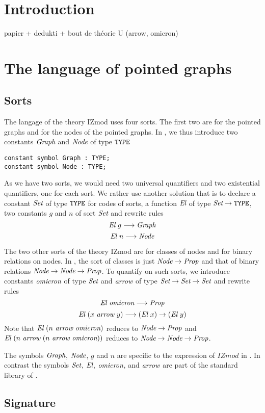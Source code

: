 \documentclass[a4paper]{article}
\begin{document}
\thispagestyle{empty}
\section{Introduction}

papier + dedukti + bout de théorie U (arrow, omicron)

\section{The language of pointed graphs}

\subsection{Sorts}

The langage of the theory IZmod uses four sorts. The first two are for
the pointed graphs and for the nodes of the pointed graphs.  In
\dedukti, we thus introduce two constants ${\mbox{\it Graph}}$ and ${\mbox{\it Node}}$ of type
$\mbox{\tt TYPE}$
\begin{verbatim}
constant symbol Graph : TYPE;
constant symbol Node : TYPE;
\end{verbatim}
As we have two sorts, we would need two universal quantifiers and two
existential quantifiers, one for each sort.  We rather use another
solution \cite{theoryU} that is to declare a constant $\mbox{\it Set}$ of type
$\mbox{\tt TYPE}$ for codes of sorts, a function ${\mbox{\it El}}$ of type $\mbox{\it Set} \rightarrow \mbox{\tt TYPE}$,
two constants $g$ and $n$ of sort $\mbox{\it Set}$ and rewrite rules
$${\mbox{\it El}}~g \longrightarrow {\mbox{\it Graph}}$$
$${\mbox{\it El}}~n \longrightarrow {\mbox{\it Node}}$$

The two other sorts of the theory IZmod are for classes of nodes and
for binary relations on nodes.  In \dedukti, the sort of classes is
just ${\mbox{\it Node}} \rightarrow {\mbox{\it Prop}}$ and that of binary relations
${\mbox{\it Node}} \rightarrow {\mbox{\it Node}} \rightarrow {\mbox{\it Prop}}$. To quantify on such sorts, we introduce
constants ${\mbox{\it omicron}}$ of type $\mbox{\it Set}$ and ${\mbox{\it arrow}} $ of type
$\mbox{\it Set} \rightarrow \mbox{\it Set} \rightarrow \mbox{\it Set}$ and rewrite rules
$${\mbox{\it El}}~{\mbox{\it omicron}} \longrightarrow {\mbox{\it Prop}}$$
$${\mbox{\it El}}~(x~{\mbox{\it arrow}}~y) \longrightarrow ({\mbox{\it El}}~x) \rightarrow ({\mbox{\it El}}~y)$$
Note that ${\mbox{\it El}}~(n~{\mbox{\it arrow}}~{\mbox{\it omicron}})$ reduces to ${\mbox{\it Node}} \rightarrow {\mbox{\it Prop}}$ and 
${\mbox{\it El}}~(n~{\mbox{\it arrow}}~(n~{\mbox{\it arrow}}~{\mbox{\it omicron}}))$ reduces to ${\mbox{\it Node}} \rightarrow {\mbox{\it Node}} \rightarrow {\mbox{\it Prop}}$. 

The symbols ${\mbox{\it Graph}}$, ${\mbox{\it Node}}$, $g$ and $n$ are specific to the
expression of $IZmod$ in \dedukti. In contrast the symbols $\mbox{\it Set}$,
${\mbox{\it El}}$, ${\mbox{\it omicron}}$, and ${\mbox{\it arrow}}$ are part of the standard library of 
\dedukti.

\subsection{Signature}
\end{document}
